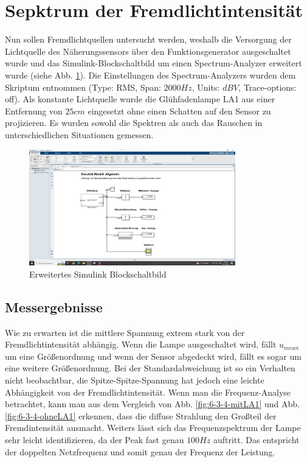 \documentclass[a4paper]{article}
\begin{document}
\section{Sepktrum der Fremdlichtintensität}
Nun sollen Fremdlichtquellen untersucht werden, weshalb die Versorgung der
Lichtquelle des Näherungssensors über den Funktionsgenerator ausgeschaltet wurde
und das Simulink-Blockschaltbild um einen Spectrum-Analyzer erweitert wurde
(siehe Abb. \ref{fig:6-3-4-Simulink}). Die Einstellungen des Spectrum-Analyzers
wurden dem Skriptum entnommen (Type: RMS, Span: $2000 \unit{Hz}$, Units:  $dBV$, Trace-options: off).
Als konstante Lichtquelle wurde die Glühfadenlampe LA1 aus einer Entfernung von
$25\unit{cm}$ eingesetzt ohne einen Schatten auf den Sensor zu projizieren.
Es wurden sowohl die Spektren als auch das Rauschen in unterschiedlichen Situationen
gemessen.

\begin{figure}[h]
    \centering
    \includegraphics[width=0.8\textwidth]{schematics/6.3.4)spektrum_schaltung.jpg}
    \caption{Erweitertes Simulink Blockschaltbild}
    \label{fig:6-3-4-Simulink}
\end{figure}


\subsection{Messergebnisse}
Wie zu erwarten ist die mittlere Spannung extrem stark von der Fremdlichtintensität
abhängig. Wenn die Lampe ausgeschaltet wird, fällt $u_{mean}$ um eine Größenordnung
und wenn der Sensor abgedeckt wird, fällt es sogar um eine weitere Größenordnung.
Bei der Standardabweichung ist so ein Verhalten nicht beobachtbar, die Spitze-Spitze-Spannung
hat jedoch eine leichte Abhängigkeit von der Fremdlichtintensität. Wenn man
die Frequenz-Analyse betrachtet, kann man aus dem Vergleich von Abb. \ref{fig:6-3-4-mitLA1}
und Abb. \ref{fig:6-3-4-ohneLA1} erkennen, dass die diffuse Strahlung den Großteil
der Fremdintensität ausmacht. Weiters lässt sich das Frequenzspektrum der Lampe
sehr leicht identifizieren, da der Peak fast genau $100\unit{Hz}$ auftritt.
Das entspricht der doppelten Netzfrequenz und somit genau der Frequenz der Leistung.
\end{document}
